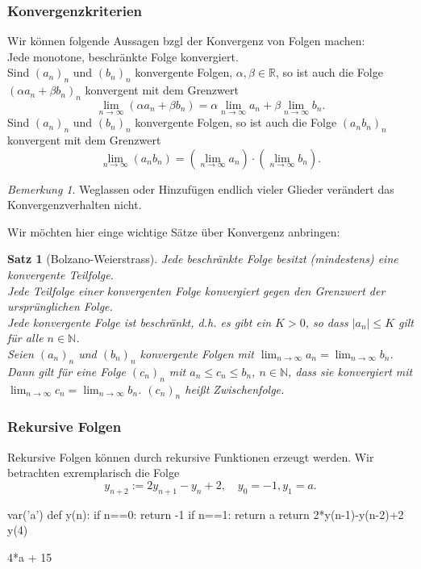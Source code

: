 \documentclass[fontsize=12pt,paper=a4,twoside,bibtotoc,idxtotoc,
liststotoc,pagesize,BCOR1.2cm,DIV15,chapterprefix,pagesize=pdftex]{scrbook}
\theoremstyle{plain}
\newtheorem{sz}[equation]{Satz}
\theoremstyle{definition}
\theoremstyle{remark}
\newtheorem{bem}[equation]{Bemerkung}
\begin{document}
\subsubsection{Konvergenzkriterien}
Wir können folgende Aussagen bzgl der Konvergenz von Folgen machen:\\
Jede monotone, beschränkte Folge konvergiert.\\
Sind $(a_n)_n$ und $(b_n)_n$ konvergente Folgen, $\alpha, \beta \in \mathbb{R}$, so ist auch die
                   Folge $( \alpha a_n+\beta b_n)_n$ konvergent mit
                   dem Grenzwert
 \[ \lim_{n \rightarrow \infty} ( \alpha a_n + \beta b_n)= \alpha
                   \lim_{n \rightarrow \infty} a_n + \beta \lim_{n
                   \rightarrow \infty} b_n .\]
Sind $(a_n)_n$ und $(b_n)_n$ konvergente Folgen, so ist auch die
                   Folge $(a_n b_n)_n$ konvergent mit
                   dem Grenzwert
 \[
  \lim_{n \rightarrow \infty} ( a_n b_n)= 
                   (\lim_{n \rightarrow \infty} a_n) \cdot  (\lim_{n
                   \rightarrow \infty} b_n).
 \]
\begin{bem}
  Weglassen oder Hinzufügen endlich vieler Glieder verändert das
                   Konvergenzverhalten nicht.
\end{bem}
Wir möchten hier einge wichtige Sätze über Konvergenz anbringen:
\begin{sz}[Bolzano-Weierstrass]
Jede beschränkte Folge besitzt (mindestens) eine
konvergente Teilfolge.\\
 Jede Teilfolge einer konvergenten Folge konvergiert gegen den
Grenzwert der ursprünglichen Folge.\\
 Jede konvergente Folge ist beschränkt, d.h. es gibt ein $K>0$,
so dass $|a_n|\leq K$ gilt für alle $n \in \mathbb{N}$.\\
Seien $(a_n)_n$ und $(b_n)_n$ konvergente Folgen mit $\lim_{n
\rightarrow \infty} a_n = \lim_{n \rightarrow \infty} b_n$. Dann gilt
für eine Folge $(c_n)_n$ mit $a_n \leq c_n \leq b_n$, $n \in
\mathbb{N}$, dass sie konvergiert mit  $\lim_{n
\rightarrow \infty} c_n = \lim_{n \rightarrow \infty} b_n$. $(c_n)_n$ heißt Zwischenfolge.
\end{sz}
\subsubsection{Rekursive Folgen}
Rekursive Folgen können durch rekursive Funktionen erzeugt werden.
Wir betrachten exremplarisch die Folge 
\[ y_{n+2}:=2y_{n+1}-y_n+2, \quad y_0=-1, y_1=a. \]
\begin{sagein}
var('a')
def y(n):
   if n==0:
       return -1
   if n==1:
       return a
   return 2*y(n-1)-y(n-2)+2
y(4)
\end{sagein}
\begin{sageout}
4*a + 15
\end{sageout}
\end{document}
